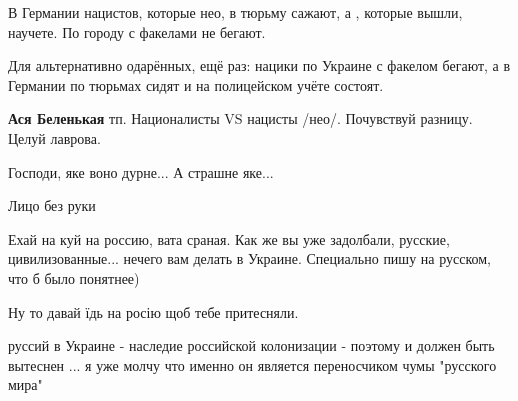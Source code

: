 \begin{itemize}
\begin{itemize}

В Германии нацистов, которые нео, в тюрьму сажают, а , которые вышли, научете. По городу с факелами не бегают.


Для альтернативно одарённых, ещё раз: нацики по Украине с факелом бегают, а в Германии по тюрьмах сидят и на полицейском учёте состоят.


\textbf{Ася Беленькая} тп. Националисты VS нацисты /нео/. Почувствуй разницу. Целуй лаврова.


\end{itemize}


Господи, яке воно дурне... А страшне яке...


Лицо без руки


Ехай на куй на россию, вата сраная.
Как же вы уже задолбали, русские, цивилизованные... нечего вам делать в Украине.
Специально пишу на русском, что б было понятнее)


Ну то давай їдь на росію щоб тебе притесняли.


руссий в Украине - наследие российской колонизации - поэтому и должен быть вытеснен ... я уже молчу что именно он является переносчиком чумы "русского мира"



\end{itemize}
